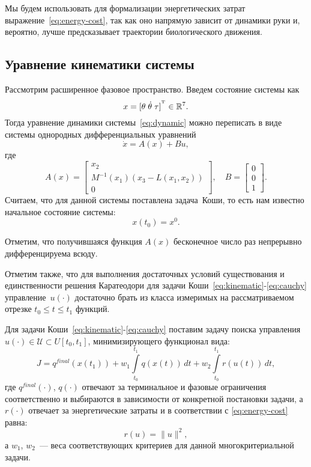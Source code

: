 Мы будем использовать для формализации энергетических затрат выражение~\eqref{eq:energy-cost}, так как оно напрямую зависит от динамики руки и, вероятно, лучше предсказывает траектории биологического движения.

\subsection{Уравнение кинематики системы}

Рассмотрим расширенное фазовое пространство.
Введем состояние системы как
$$
    x = [\theta\;\dot\theta\;\tau]^{^\mathrm{T}} \in \mathbb{R}^7.
$$
Тогда уравнение динамики системы~\eqref{eq:dynamic} можно переписать в виде системы однородных дифференциальных уравнений
\begin{equation}\label{eq:kinematic}
    \dot x = A(x) + Bu,
\end{equation}
где 
$$
    A(x) = \left[\begin{aligned}
        x_2 \\
        M^{-1}(x_1)(x_3 - L(x_1, x_2)) \\
        0
    \end{aligned}\right]
    ,\quad
    B = \left[\begin{aligned}
        0 \\
        0 \\
        1
    \end{aligned}\right].
$$
Считаем, что для данной системы поставлена задача~Коши, то есть нам известно начальное состояние системы:
\begin{equation}\label{eq:cauchy}
    x(t_0) = x^0.
\end{equation}
\begin{remark}
    Отметим, что получившаяся функция $A(x)$ бесконечное число раз непрерывно дифференцируема всюду.
\end{remark}
\begin{remark}
    Отметим также, что для выполнения достаточных условий существования и единственности решения Каратеодори для задачи Коши~\eqref{eq:kinematic}-\eqref{eq:cauchy} управление~$u(\cdot)$ достаточно брать из класса измеримых на рассматриваемом отрезке $t_0\leqslant t \leqslant t_1$ функций.
\end{remark}

Для задачи Коши~\eqref{eq:kinematic}-\eqref{eq:cauchy} поставим задачу поиска управления $u(\cdot) \in \mathcal{U} \subset U[t_0,t_1]$, минимизирующего функционал вида:
\begin{equation}\label{eq:continuos-cost}
    J = q^{final}(x(t_1)) + w_1\int\limits_{t_0}^{t_1} q(x(t))\,dt + w_2\int\limits_{t_0}^{t_1} r(u(t))\,dt,
\end{equation}
где $q^{final}(\cdot)$, $q(\cdot)$ отвечают за терминальное и фазовые ограничения соответственно и выбираются в зависимости от конкретной постановки задачи, а $r(\cdot)$ отвечает за энергетические затраты и в соответствии с \eqref{eq:energy-cost} равна:
$$
    r(u) = \|u\|^2,
$$
а $w_1$, $w_2$~--- веса соответствующих критериев для данной многокритериальной задачи.


